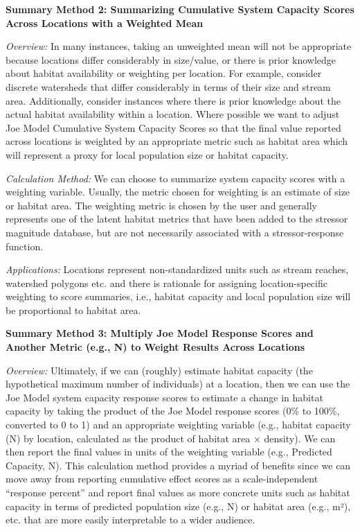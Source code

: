 \documentclass[
  letterpaper,
  DIV=11,
  numbers=noendperiod]{scrreprt}
\begin{document}
\textbf{Summary Method 2: Summarizing Cumulative System Capacity Scores
Across Locations with a Weighted Mean}

\emph{Overview:} In many instances, taking an unweighted mean will not
be appropriate because locations differ considerably in size/value, or
there is prior knowledge about habitat availability or weighting per
location. For example, consider discrete watersheds that differ
considerably in terms of their size and stream area. Additionally,
consider instances where there is prior knowledge about the actual
habitat availability within a location. Where possible we want to adjust
Joe Model Cumulative System Capacity Scores so that the final value
reported across locations is weighted by an appropriate metric such as
habitat area which will represent a proxy for local population size or
habitat capacity.

\emph{Calculation Method:} We can choose to summarize system capacity
scores with a weighting variable. Usually, the metric chosen for
weighting is an estimate of size or habitat area. The weighting metric
is chosen by the user and generally represents one of the latent habitat
metrics that have been added to the stressor magnitude database, but are
not necessarily associated with a stressor-response function.

\emph{Applications:} Locations represent non-standardized units such as
stream reaches, watershed polygons etc. and there is rationale for
assigning location-specific weighting to score summaries, i.e., habitat
capacity and local population size will be proportional to habitat area.

\textbf{Summary Method 3: Multiply Joe Model Response Scores and Another
Metric (e.g., N) to Weight Results Across Locations}

\emph{Overview:} Ultimately, if we can (roughly) estimate habitat
capacity (the hypothetical maximum number of individuals) at a location,
then we can use the Joe Model system capacity response scores to
estimate a change in habitat capacity by taking the product of the Joe
Model response scores (0\% to 100\%, converted to 0 to 1) and an
appropriate weighting variable (e.g., habitat capacity (N) by location,
calculated as the product of habitat area × density). We can then report
the final values in units of the weighting variable (e.g., Predicted
Capacity, N). This calculation method provides a myriad of benefits
since we can move away from reporting cumulative effect scores as a
scale-independent ``response percent'' and report final values as more
concrete units such as habitat capacity in terms of predicted population
size (e.g., N) or habitat area (e.g., m²), etc. that are more easily
interpretable to a wider audience.
\end{document}
